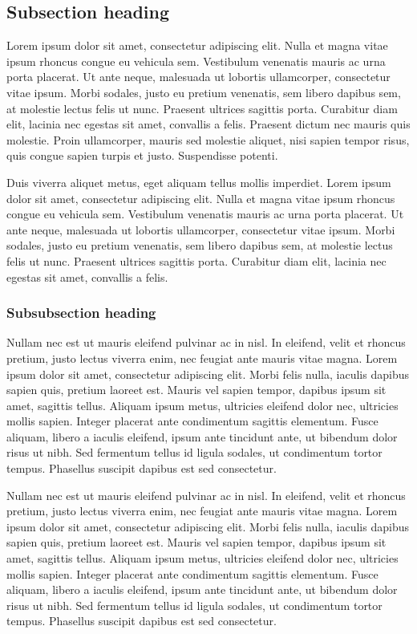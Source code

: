 \documentclass[man,longtable,noextraspace,floatsintext]{apa6}
\begin{document}
\hypertarget{subsection-heading}{%
\subsection{Subsection heading}\label{subsection-heading}}

Lorem ipsum dolor sit amet, consectetur adipiscing elit. Nulla et magna
vitae ipsum rhoncus congue eu vehicula sem. Vestibulum venenatis mauris
ac urna porta placerat. Ut ante neque, malesuada ut lobortis
ullamcorper, consectetur vitae ipsum. Morbi sodales, justo eu pretium
venenatis, sem libero dapibus sem, at molestie lectus felis ut nunc.
Praesent ultrices sagittis porta. Curabitur diam elit, lacinia nec
egestas sit amet, convallis a felis. Praesent dictum nec mauris quis
molestie. Proin ullamcorper, mauris sed molestie aliquet, nisi sapien
tempor risus, quis congue sapien turpis et justo. Suspendisse potenti.

Duis viverra aliquet metus, eget aliquam tellus mollis imperdiet. Lorem
ipsum dolor sit amet, consectetur adipiscing elit. Nulla et magna vitae
ipsum rhoncus congue eu vehicula sem. Vestibulum venenatis mauris ac
urna porta placerat. Ut ante neque, malesuada ut lobortis ullamcorper,
consectetur vitae ipsum. Morbi sodales, justo eu pretium venenatis, sem
libero dapibus sem, at molestie lectus felis ut nunc. Praesent ultrices
sagittis porta. Curabitur diam elit, lacinia nec egestas sit amet,
convallis a felis.

\hypertarget{subsubsection-heading}{%
\subsubsection{Subsubsection heading}\label{subsubsection-heading}}

Nullam nec est ut mauris eleifend pulvinar ac in nisl. In eleifend,
velit et rhoncus pretium, justo lectus viverra enim, nec feugiat ante
mauris vitae magna. Lorem ipsum dolor sit amet, consectetur adipiscing
elit. Morbi felis nulla, iaculis dapibus sapien quis, pretium laoreet
est. Mauris vel sapien tempor, dapibus ipsum sit amet, sagittis tellus.
Aliquam ipsum metus, ultricies eleifend dolor nec, ultricies mollis
sapien. Integer placerat ante condimentum sagittis elementum. Fusce
aliquam, libero a iaculis eleifend, ipsum ante tincidunt ante, ut
bibendum dolor risus ut nibh. Sed fermentum tellus id ligula sodales, ut
condimentum tortor tempus. Phasellus suscipit dapibus est sed
consectetur.

Nullam nec est ut mauris eleifend pulvinar ac in nisl. In eleifend,
velit et rhoncus pretium, justo lectus viverra enim, nec feugiat ante
mauris vitae magna. Lorem ipsum dolor sit amet, consectetur adipiscing
elit. Morbi felis nulla, iaculis dapibus sapien quis, pretium laoreet
est. Mauris vel sapien tempor, dapibus ipsum sit amet, sagittis tellus.
Aliquam ipsum metus, ultricies eleifend dolor nec, ultricies mollis
sapien. Integer placerat ante condimentum sagittis elementum. Fusce
aliquam, libero a iaculis eleifend, ipsum ante tincidunt ante, ut
bibendum dolor risus ut nibh. Sed fermentum tellus id ligula sodales, ut
condimentum tortor tempus. Phasellus suscipit dapibus est sed
consectetur.
\end{document}
